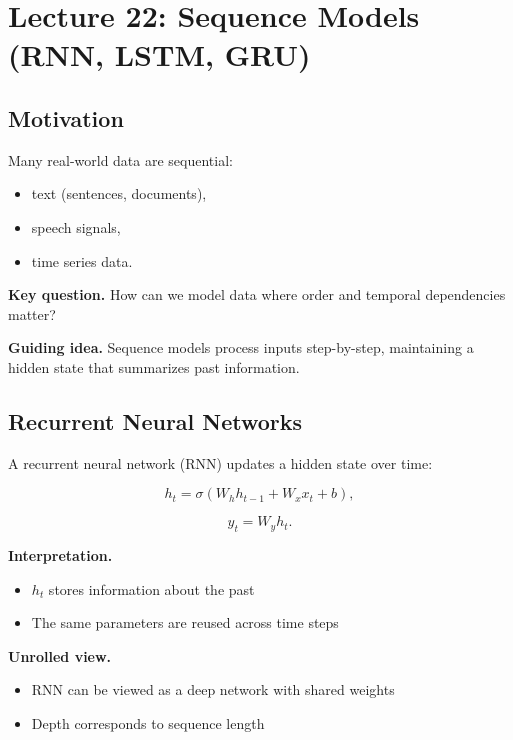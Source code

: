 \section{Lecture 22: Sequence Models (RNN, LSTM, GRU)}

\subsection{Motivation}

Many real-world data are sequential:

\begin{itemize}
    \item text (sentences, documents),
    \item speech signals,
    \item time series data.
\end{itemize}

\medskip

\noindent
\textbf{Key question.}  
How can we model data where order and temporal dependencies matter?

\medskip

\noindent
\textbf{Guiding idea.}  
Sequence models process inputs step-by-step, maintaining a hidden state that summarizes past information.

\subsection{Recurrent Neural Networks}

A recurrent neural network (RNN) updates a hidden state over time:

\[
h_t = \sigma(W_h h_{t-1} + W_x x_t + b),
\]

\[
y_t = W_y h_t.
\]

\medskip

\noindent
\textbf{Interpretation.}

\begin{itemize}
    \item $h_t$ stores information about the past
    \item The same parameters are reused across time steps
\end{itemize}

\medskip

\noindent
\textbf{Unrolled view.}

\begin{itemize}
    \item RNN can be viewed as a deep network with shared weights
    \item Depth corresponds to sequence length
\end{itemize}

